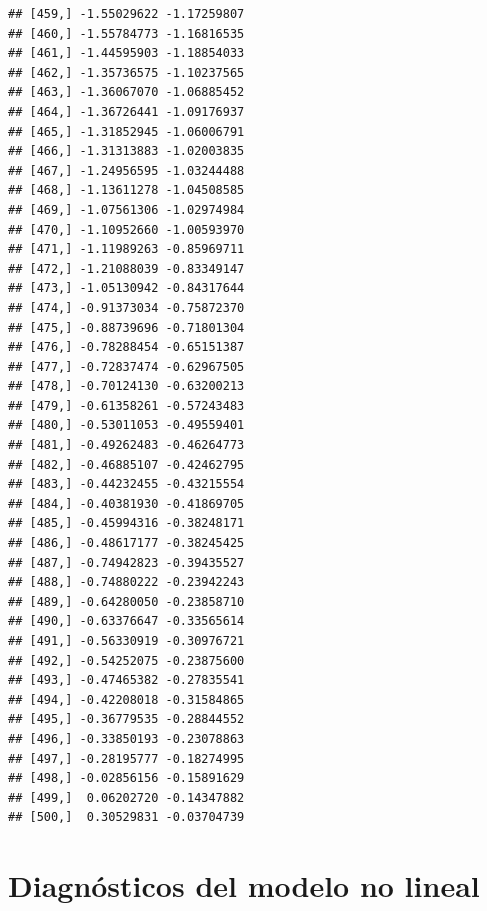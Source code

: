 \documentclass[12pt, twoside]{book}\usepackage[]{graphicx}\usepackage[]{color}
\makeatletter
\newenvironment{kframe}{%
 \def\at@end@of@kframe{}%
 \ifinner\ifhmode%
  \def\at@end@of@kframe{\end{minipage}}%
  \begin{minipage}{\columnwidth}%
 \fi\fi%
 \def\FrameCommand##1{\hskip\@totalleftmargin \hskip-\fboxsep
 \colorbox{shadecolor}{##1}\hskip-\fboxsep
     \hskip-\linewidth \hskip-\@totalleftmargin \hskip\columnwidth}%
 \MakeFramed {\advance\hsize-\width
   \@totalleftmargin\z@ \linewidth\hsize
   \@setminipage}}%
 {\par\unskip\endMakeFramed%
 \at@end@of@kframe}
\newenvironment{knitrout}{}{} %
\numberwithin{equation}{section}
\numberwithin{theorem}{section}
\numberwithin{teorema}{section}
\numberwithin{defi}{section}
\numberwithin{prop}{section}
\numberwithin{defi}{section}
\theoremstyle{plain}
\makeatother
\begin{document}
\begin{knitrout}
\begin{kframe}
\begin{verbatim}
## [459,] -1.55029622 -1.17259807
## [460,] -1.55784773 -1.16816535
## [461,] -1.44595903 -1.18854033
## [462,] -1.35736575 -1.10237565
## [463,] -1.36067070 -1.06885452
## [464,] -1.36726441 -1.09176937
## [465,] -1.31852945 -1.06006791
## [466,] -1.31313883 -1.02003835
## [467,] -1.24956595 -1.03244488
## [468,] -1.13611278 -1.04508585
## [469,] -1.07561306 -1.02974984
## [470,] -1.10952660 -1.00593970
## [471,] -1.11989263 -0.85969711
## [472,] -1.21088039 -0.83349147
## [473,] -1.05130942 -0.84317644
## [474,] -0.91373034 -0.75872370
## [475,] -0.88739696 -0.71801304
## [476,] -0.78288454 -0.65151387
## [477,] -0.72837474 -0.62967505
## [478,] -0.70124130 -0.63200213
## [479,] -0.61358261 -0.57243483
## [480,] -0.53011053 -0.49559401
## [481,] -0.49262483 -0.46264773
## [482,] -0.46885107 -0.42462795
## [483,] -0.44232455 -0.43215554
## [484,] -0.40381930 -0.41869705
## [485,] -0.45994316 -0.38248171
## [486,] -0.48617177 -0.38245425
## [487,] -0.74942823 -0.39435527
## [488,] -0.74880222 -0.23942243
## [489,] -0.64280050 -0.23858710
## [490,] -0.63376647 -0.33565614
## [491,] -0.56330919 -0.30976721
## [492,] -0.54252075 -0.23875600
## [493,] -0.47465382 -0.27835541
## [494,] -0.42208018 -0.31584865
## [495,] -0.36779535 -0.28844552
## [496,] -0.33850193 -0.23078863
## [497,] -0.28195777 -0.18274995
## [498,] -0.02856156 -0.15891629
## [499,]  0.06202720 -0.14347882
## [500,]  0.30529831 -0.03704739
\end{verbatim}
\end{kframe}
\end{knitrout}

\section{Diagnósticos del modelo no lineal}


\begin{knitrout}
\color{fgcolor}\begin{kframe}


{\ttfamily\noindent\bfseries\color{errorcolor}{\#\# Error in residuals(mono\_rest): objeto 'mono\_rest' no encontrado}}

{\ttfamily\noindent\bfseries\color{errorcolor}{\#\# Error in residuals(mono\_rest): objeto 'mono\_rest' no encontrado}}

{\ttfamily\noindent\bfseries\color{errorcolor}{\#\# Error in residuals(mono\_rest): objeto 'mono\_rest' no encontrado}}

{\ttfamily\noindent\bfseries\color{errorcolor}{\#\# Error in residuals(mono\_rest): objeto 'mono\_rest' no encontrado}}\end{kframe}
\end{knitrout}
\end{document}

